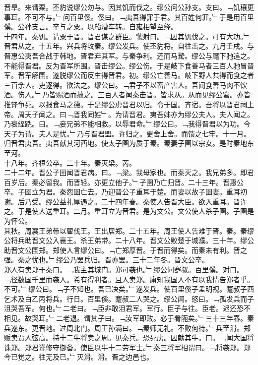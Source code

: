 \documentclass{zhvt-classic}
\begin{document}
\hspace*{2em}晋旱。来请粟。丕豹说缪公勿与。因其饥而伐之。缪公问公孙支。支曰。﹁饥穰更事耳。不可不与。﹂问百里傒。傒曰。﹁夷吾得罪于君。其百姓何罪。﹂于是用百里傒。公孙支言。卒与之粟。以船漕车转。自雍相望至绛。\\
\hspace*{2em}十四年。秦饥。请粟于晋。晋君谋之群臣。虢射曰。﹁因其饥伐之。可有大功。﹂晋君从之。十五年。兴兵将攻秦。缪公发兵。使丕豹将。自往击之。九月壬戌。与晋惠公夷吾合战于韩地。晋君弃其军。与秦争利。还而马騺。缪公与麾下驰追之。不能得晋君。反为晋军所围。晋击缪公。缪公伤。于是岐下食善马者三百人驰冒晋军。晋军解围。遂脱缪公而反生得晋君。初。缪公亡善马。岐下野人共得而食之者三百余人。吏逐得。欲法之。缪公曰。﹁君子不以畜产害人。吾闻食善马肉不饮酒。伤人。﹂乃皆赐酒而赦之。三百人者闻秦击晋。皆求从。从而见缪公窘。亦皆推锋争死。以报食马之德。于是缪公虏晋君以归。令于国。齐宿。吾将以晋君祠上帝。周天子闻之。曰﹁晋我同姓﹂。为请晋君。夷吾姊亦为缪公夫人。夫人闻之。乃衰绖跣。曰。﹁妾兄弟不能相救。以辱君命。﹂缪公曰。﹁我得晋君以为功。今天子为请。夫人是忧。﹂乃与晋君盟。许归之。更舍上舍。而馈之七牢。十一月。归晋君夷吾。夷吾献其河西地。使太子圉为质于秦。秦妻子圉以宗女。是时秦地东至河。\\
\hspace*{2em}十八年。齐桓公卒。二十年。秦灭梁。芮。\\
\hspace*{2em}二十二年。晋公子圉闻晋君病。曰。﹁梁。我母家也。而秦灭之。我兄弟多。即君百岁后。秦必留我。而晋轻。亦更立他子。﹂子圉乃亡归晋。二十三年。晋惠公卒。子圉立为君。秦怨圉亡去。乃迎晋公子重耳于楚。而妻以故子圉妻。重耳初谢。后乃受。缪公益礼厚遇之。二十四年春。秦使人告晋大臣。欲入重耳。晋许之。于是使人送重耳。二月。重耳立为晋君。是为文公。文公使人杀子圉。子圉是为怀公。\\
\hspace*{2em}其秋。周襄王弟带以翟伐王。王出居郑。二十五年。周王使人告难于晋。秦。秦缪公将兵助晋文公入襄王。杀王弟带。二十八年。晋文公败楚于城濮。三十年。缪公助晋文公围郑。郑使人言缪公曰。﹁亡郑厚晋。于晋而得矣。而秦未有利。晋之强。秦之忧也。﹂缪公乃罢兵归。晋亦罢。三十二年冬。晋文公卒。\\
\hspace*{2em}郑人有卖郑于秦曰。﹁我主其城门。郑可袭也。﹂缪公问蹇叔。百里傒。对曰。﹁径数国千里而袭人。希有得利者。且人卖郑。庸知我国人不有以我情告郑者乎。不可。﹂缪公曰。﹁子不知也。吾已决矣。﹂遂发兵。使百里傒子孟明视。蹇叔子西乞术及白乙丙将兵。行日。百里傒。蹇叔二人哭之。缪公闻。怒曰。﹁孤发兵而子沮哭吾军。何也。﹂二老曰。﹁臣非敢沮君军。军行。臣子与往。臣老。迟还恐不相见。故哭耳。﹂二老退。谓其子曰。﹁汝军即败。必于肴阨矣。﹂三十三年春。秦兵遂东。更晋地。过周北门。周王孙满曰。﹁秦师无礼。不败何待。﹂兵至滑。郑贩卖贾人弦高。持十二牛将卖之周。见秦兵。恐死虏。因献其牛。曰。﹁闻大国将诛郑。郑君谨修守御备。使臣以牛十二劳军士。﹂秦三将军相谓曰。﹁将袭郑。郑今已觉之。往无及已。﹂灭滑。滑。晋之边邑也。\\
\end{document}
